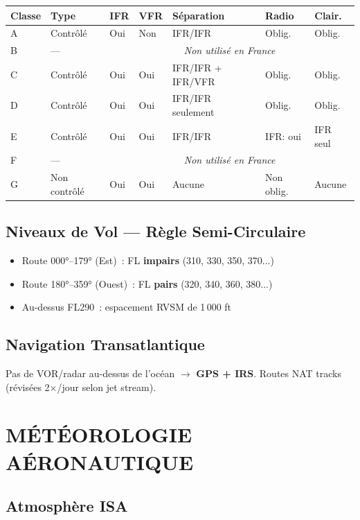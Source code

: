 \documentclass[11pt,a4paper]{article}
\begin{document}
\begin{tabular}{p{1.5cm}p{2cm}p{1cm}p{1cm}p{3.5cm}p{2cm}p{2cm}}
\toprule
\textbf{Classe} & \textbf{Type} & \textbf{IFR} & \textbf{VFR} & \textbf{Séparation} & \textbf{Radio} & \textbf{Clair.} \\
\midrule
A & Contrôlé & Oui & Non & IFR/IFR & Oblig. & Oblig. \\
B & --- & \multicolumn{5}{c}{\textit{Non utilisé en France}} \\
C & Contrôlé & Oui & Oui & IFR/IFR + IFR/VFR & Oblig. & Oblig. \\
D & Contrôlé & Oui & Oui & IFR/IFR seulement & Oblig. & Oblig. \\
E & Contrôlé & Oui & Oui & IFR/IFR & IFR: oui & IFR seul \\
F & --- & \multicolumn{5}{c}{\textit{Non utilisé en France}} \\
G & Non contrôlé & Oui & Oui & Aucune & Non oblig. & Aucune \\
\bottomrule
\end{tabular}

\subsection{Niveaux de Vol --- Règle Semi-Circulaire}
\begin{itemize}[nosep]
\item Route 000°--179° (Est)~: FL \textbf{impairs} (310, 330, 350, 370...)
\item Route 180°--359° (Ouest)~: FL \textbf{pairs} (320, 340, 360, 380...)
\item Au-dessus FL290~: espacement RVSM de 1\,000 ft
\end{itemize}

\subsection{Navigation Transatlantique}
Pas de VOR/radar au-dessus de l'océan $\to$ \textbf{GPS + IRS}. Routes NAT tracks (révisées 2$\times$/jour selon jet stream).

\section{MÉTÉOROLOGIE AÉRONAUTIQUE}

\subsection{Atmosphère ISA}
\end{document}
